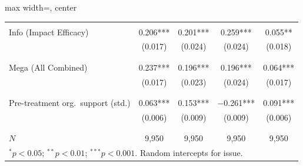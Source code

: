 \begin{table}[htbp]
\begin{adjustbox}{max width=\linewidth, center}
\begin{tabular}{lcccc}
\cellcolor{gray!15}{} & \cellcolor{gray!15}{(0.016)} & \cellcolor{gray!15}{(0.023)} & \cellcolor{gray!15}{(0.023)} & \cellcolor{gray!15}{(0.017)} \\
\addlinespace
Info (Impact Efficacy) & 0.206*** & 0.201*** & 0.259*** & 0.055** \\
 & (0.017) & (0.024) & (0.024) & (0.018) \\
\addlinespace
\cellcolor{gray!15}{Info (Issue)} & \cellcolor{gray!15}{0.162***} & \cellcolor{gray!15}{0.249***} & \cellcolor{gray!15}{0.320***} & \cellcolor{gray!15}{0.087***} \\
\cellcolor{gray!15}{} & \cellcolor{gray!15}{(0.017)} & \cellcolor{gray!15}{(0.024)} & \cellcolor{gray!15}{(0.024)} & \cellcolor{gray!15}{(0.018)} \\
\addlinespace
Mega (All Combined) & 0.237*** & 0.196*** & 0.196*** & 0.064*** \\
 & (0.017) & (0.023) & (0.024) & (0.017) \\
\addlinespace
\cellcolor{gray!15}{Pre-treatment petition support (std.)} & \cellcolor{gray!15}{0.139***} & \cellcolor{gray!15}{$-$0.295***} & \cellcolor{gray!15}{0.156***} & \cellcolor{gray!15}{0.084***} \\
\cellcolor{gray!15}{} & \cellcolor{gray!15}{(0.006)} & \cellcolor{gray!15}{(0.008)} & \cellcolor{gray!15}{(0.009)} & \cellcolor{gray!15}{(0.006)} \\
\addlinespace
Pre-treatment org.\ support (std.) & 0.063*** & 0.153*** & $-$0.261*** & 0.091*** \\
 & (0.006) & (0.009) & (0.009) & (0.006) \\
\addlinespace
\cellcolor{gray!15}{Intercept} & \cellcolor{gray!15}{0.208***} & \cellcolor{gray!15}{0.043} & \cellcolor{gray!15}{0.045*} & \cellcolor{gray!15}{0.331***} \\
\cellcolor{gray!15}{} & \cellcolor{gray!15}{(0.015)} & \cellcolor{gray!15}{(0.035)} & \cellcolor{gray!15}{(0.021)} & \cellcolor{gray!15}{(0.025)} \\
\addlinespace
\midrule
$N$ & 9,950 & 9,950 & 9,950 & 9,950 \\
\bottomrule
\multicolumn{5}{l}{\footnotesize $^{*}p<0.05$; $^{**}p<0.01$; $^{***}p<0.001$. Random intercepts for issue.} \\
\end{tabular}
\endgroup{}

\end{adjustbox}
\end{table}
